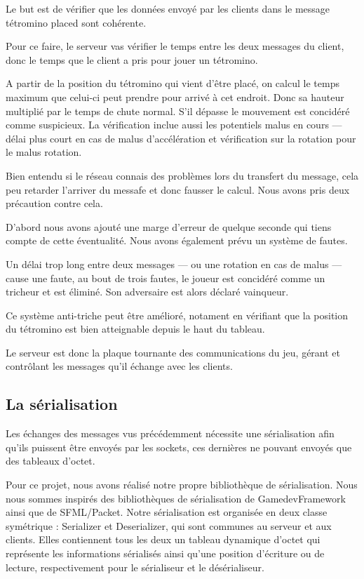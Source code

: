 \documentclass[a4paper, 12pt]{article}
\begin{document}
			Le but est de vérifier que les données envoyé par les clients dans le message tétromino placed sont cohérente. 

			Pour ce faire, le serveur vas vérifier le temps entre les deux messages du client, donc le temps que le client a pris pour jouer un tétromino.

			A partir de la position du tétromino qui vient d'être placé, on calcul le temps maximum que celui-ci peut prendre pour arrivé à cet endroit. Donc sa hauteur multiplié par le temps de chute normal.
			S'il dépasse le mouvement est concidéré comme suspicieux.
			La vérification inclue aussi les potentiels malus en cours --- délai plus court en cas de malus d'accélération et vérification sur la rotation pour le malus rotation.

			Bien entendu si le réseau connais des problèmes lors du transfert du message, cela peu retarder l'arriver du messafe et donc fausser le calcul. Nous avons pris deux précaution contre cela. 

			D'abord nous avons ajouté une marge d'erreur de quelque seconde qui tiens compte de cette éventualité. Nous avons également prévu un système de fautes.

			Un délai trop long entre deux messages --- ou une rotation en cas de malus --- cause une faute, au bout de trois fautes, le joueur est concidéré comme un tricheur et est éliminé. Son adversaire est alors déclaré vainqueur.


			Ce système anti-triche peut être amélioré, notament en vérifiant que la position du tétromino est bien atteignable depuis le haut du tableau.

			Le serveur est donc la plaque tournante des communications du jeu, gérant et contrôlant les messages qu'il échange avec les clients. 

	\subsection{La sérialisation}

		Les échanges des messages vus précédemment nécessite une sérialisation afin qu'ils puissent être envoyés par les sockets, ces dernières ne pouvant envoyés que des tableaux d'octet.

		Pour ce projet, nous avons réalisé notre propre bibliothèque de sérialisation. Nous nous sommes inspirés des bibliothèques de sérialisation de GamedevFramework ainsi que de SFML/Packet. 
		Notre sérialisation est organisée en deux classe symétrique : Serializer et Deserializer, qui sont communes au serveur et aux clients. Elles contiennent tous les deux un tableau dynamique d'octet qui représente les informations sérialisés ainsi qu'une position d'écriture ou de lecture, respectivement pour le sérialiseur et le désérialiseur. 
		
\end{document}
